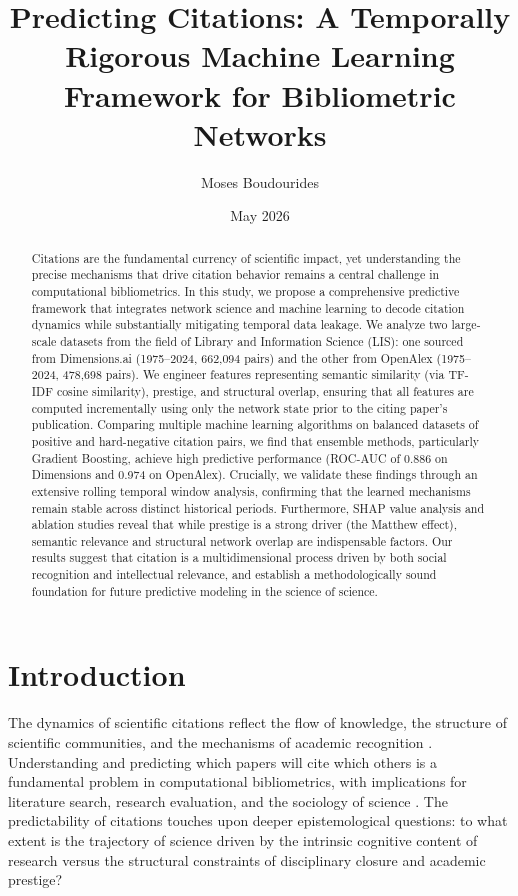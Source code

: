 \documentclass[12pt,a4paper]{article}
\title{Predicting Citations: A Temporally Rigorous Machine Learning Framework for Bibliometric Networks}
\author{Moses Boudourides}
\date{May 2026}
\begin{document}
\maketitle

\begin{abstract}
Citations are the fundamental currency of scientific impact, yet understanding the precise mechanisms that drive citation behavior remains a central challenge in computational bibliometrics. In this study, we propose a comprehensive predictive framework that integrates network science and machine learning to decode citation dynamics while substantially mitigating temporal data leakage. We analyze two large-scale datasets from the field of Library and Information Science (LIS): one sourced from Dimensions.ai (1975--2024, 662,094 pairs) and the other from OpenAlex (1975--2024, 478,698 pairs). We engineer features representing semantic similarity (via TF-IDF cosine similarity), prestige, and structural overlap, ensuring that all features are computed incrementally using only the network state prior to the citing paper's publication. Comparing multiple machine learning algorithms on balanced datasets of positive and hard-negative citation pairs, we find that ensemble methods, particularly Gradient Boosting, achieve high predictive performance (ROC-AUC of 0.886 on Dimensions and 0.974 on OpenAlex). Crucially, we validate these findings through an extensive rolling temporal window analysis, confirming that the learned mechanisms remain stable across distinct historical periods. Furthermore, SHAP value analysis and ablation studies reveal that while prestige is a strong driver (the Matthew effect), semantic relevance and structural network overlap are indispensable factors. Our results suggest that citation is a multidimensional process driven by both social recognition and intellectual relevance, and establish a methodologically sound foundation for future predictive modeling in the science of science.
\end{abstract}

\newpage
\tableofcontents
\newpage

\section{Introduction}
The dynamics of scientific citations reflect the flow of knowledge, the structure of scientific communities, and the mechanisms of academic recognition \cite{wang2008measuring, fortunato2018science}. Understanding and predicting which papers will cite which others is a fundamental problem in computational bibliometrics, with implications for literature search, research evaluation, and the sociology of science \cite{zeng2017science}. The predictability of citations touches upon deeper epistemological questions: to what extent is the trajectory of science driven by the intrinsic cognitive content of research versus the structural constraints of disciplinary closure and academic prestige?
\end{document}

